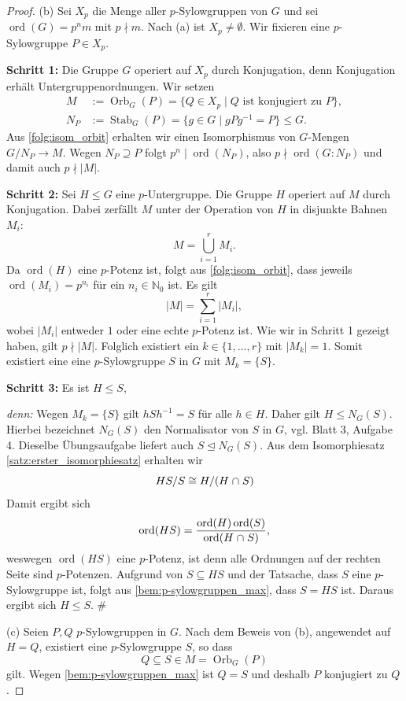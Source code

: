\documentclass[a4paper, twoside, 11pt, ngerman]{report}
\newcommand{\NN}{\mathds N}
\DeclareMathOperator{\Orb}{Orb}
\DeclareMathOperator{\ord}{ord}
\DeclareMathOperator{\Stab}{Stab}
\renewcommand{\cap}{\;\rotatebox{90}{\reflectbox{\rotatebox{270}{$\cup$}}}\;}
\theoremstyle{definistyle}
\theoremstyle{remark}
\newenvironment{denn}%
  {\par\textit{denn:}}%
  {\hfill\#\par}
\begin{document}
\begin{proof}
(b) Sei $X_p$ die Menge aller $p$-Sylowgruppen von $G$ und sei $\ord(G) = p^n m$ mit $p \nmid m$.
Nach (a) ist $X_p \neq \emptyset$. Wir fixieren eine $p$-Sylowgruppe $P \in X_p$.

\textbf{Schritt 1:} Die Gruppe $G$ operiert auf $X_p$ durch Konjugation, denn Konjugation erhält Untergruppenordnungen.
Wir setzen
\begin{align*}
M &:= \Orb_G(P) = \{Q \in X_p \mid Q \text{ ist konjugiert zu } P\}, \\
N_P &:= \Stab_G(P) = \{g \in G \mid gPg^{-1} = P\} \leq G.
\end{align*}
Aus \ref{folg:isom_orbit} erhalten wir einen Isomorphismus von $G$-Mengen $G / N_P \to M$. 
Wegen $N_P \supseteq P$ folgt $p^n \mid \ord(N_P)$, also $p \nmid \ord(G : N_P)$ und damit auch $p \nmid |M|$.

\textbf{Schritt 2:} Sei $H \leq G$ eine $p$-Untergruppe. Die Gruppe $H$ operiert auf $M$ durch Konjugation. Dabei zerfällt $M$ unter der Operation von $H$ in disjunkte Bahnen $M_i$:
\[
M = \bigcup_{i=1}^r M_i.
\]
Da $\ord(H)$ eine $p$-Potenz ist, folgt aus \ref{folg:isom_orbit}, dass jeweils $\ord(M_i)=p^{n_i}$ für ein $n_i \in \NN_0$ ist.
Es gilt
\[
|M| = \sum_{i=1}^r |M_i|,
\]
wobei $|M_i|$ entweder $1$ oder eine echte $p$-Potenz ist. Wie wir in Schritt 1 gezeigt haben, gilt $p \nmid |M|$.
Folglich existiert ein $k \in \{1, \dots, r\}$ mit $|M_k| = 1$. Somit existiert eine eine $p$-Sylowgruppe $S$ in $G$
mit $M_k = \{S\}$.

\textbf{Schritt 3:} Es ist $H \leq S$,
\begin{denn}
Wegen $M_k = \{S\}$ gilt $hSh^{-1} = S$ für alle $h \in H$. Daher gilt $H \leq N_G(S)$. Hierbei bezeichnet
$N_G(S)$ den Normalisator von $S$ in $G$, vgl. Blatt 3, Aufgabe 4. Dieselbe Übungsaufgabe liefert auch
$S \trianglelefteq N_G(S)$. Aus dem Isomorphiesatz \ref{satz:erster_isomorphiesatz} erhalten wir 
\[
HS / S \cong H / (H \cap S)
\]
Damit ergibt sich
\[
\ord(HS) = \frac{\ord(H) \ord(S)}{\ord(H \cap S)},
\]
weswegen $\ord(HS)$ eine $p$-Potenz, ist denn alle Ordnungen auf der rechten Seite sind $p$-Potenzen.
Aufgrund von $S\subseteq HS$ und der Tatsache, dass $S$ eine $p$-Sylowgruppe ist, folgt aus \ref{bem:p-sylowgruppen_max}, dass $S = HS$ ist. Daraus ergibt sich $H \leq S$.
\end{denn}
(c) Seien $P, Q$ $p$-Sylowgruppen in $G$. Nach dem Beweis von (b), angewendet auf $H=Q$, existiert eine $p$-Sylowgruppe $S$, so dass 
\[
Q \subseteq S \in M = \operatorname{Orb}_G(P)
\]
gilt. Wegen \ref{bem:p-sylowgruppen_max} ist $Q=S$ und deshalb $P$ konjugiert zu $Q$.


\end{proof}
\end{document}
